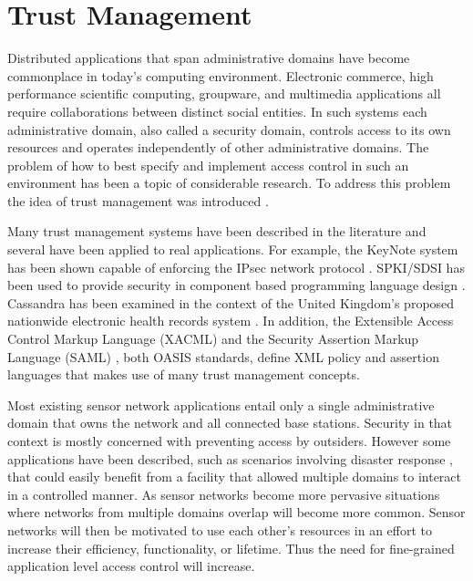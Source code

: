 
\chapter{Trust Management}
\label{chapter-trust-management}

Distributed applications that span administrative domains have become commonplace in today's
computing environment. Electronic commerce, high performance scientific computing, groupware,
and multimedia applications all require collaborations between distinct social entities. In such
systems each administrative domain, also called a security domain, controls access to its own
resources and operates independently of other administrative domains. The problem of how to best
specify and implement access control in such an environment has been a topic of considerable
research. To address this problem the idea of trust management was introduced \cite{Blaze:DTM}.

Many trust management systems have been described in the literature
\cite{chapin-skalka-wang-acmcs08} and several have been applied to real applications. For
example, the KeyNote system has been shown capable of enforcing the IPsec network protocol
\cite{Blaze:TMIPS,Blaze:EKTMS}. SPKI/SDSI has been used to provide security in component based
programming language design \cite{Liu:CSI}. Cassandra has been examined in the context of the
United Kingdom's proposed nationwide electronic health records system \cite{Becker:CFTMAEHR}. In
addition, the Extensible Access Control Markup Language (XACML) \cite{OASIS:XACMLTC} and the
Security Assertion Markup Language (SAML) \cite{OASIS:SSTC}, both OASIS standards, define XML
policy and assertion languages that makes use of many trust management concepts.

Most existing sensor network applications entail only a single administrative domain that owns
the network and all connected base stations. Security in that context is mostly concerned with
preventing access by outsiders. However some applications have been described, such as scenarios
involving disaster response \cite{XXX}, that could easily benefit from a facility that allowed
multiple domains to interact in a controlled manner. As sensor networks become more pervasive
situations where networks from multiple domains overlap will become more common. Sensor networks
will then be motivated to use each other's resources in an effort to increase their efficiency,
functionality, or lifetime. Thus the need for fine-grained application level access control will
increase.

